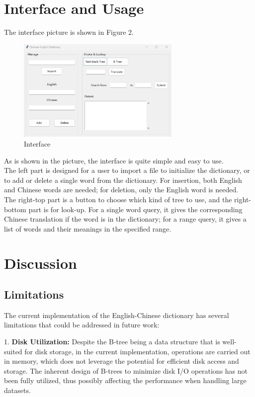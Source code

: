 \documentclass[UTF8]{ctexart}
\begin{document}
\section{Interface and Usage}
The interface picture is shown in Figure 2.\\
\begin{figure}[h]
    \centering
    \includegraphics[width=0.7\textwidth]{UI.png}
    \caption{Interface}
    \label{fig:interface}
\end{figure}

As is shown in the picture, the interface is quite simple and easy to use.\\
The left part is designed for a user to import a file to initialize the dictionary, or to
add or delete a single word from the dictionary. For insertion, both English and Chinese words are needed; 
for deletion, only the English word is needed.\\
The right-top part is a button to choose which kind of tree to use, and the right-bottom part is for look-up.
For a single word query, it gives the corresponding Chinese translation if the word is in the dictionary;
for a range query, it gives a list of words and their meanings in the specified range.\\

\section{Discussion}

\subsection{Limitations}
The current implementation of the English-Chinese dictionary has several limitations that could be addressed in future work:

1. \textbf{Disk Utilization:} Despite the B-tree being a data structure that is well-suited for disk storage, in the current implementation, operations are carried out in memory, which does not leverage the potential for efficient disk access and storage. The inherent design of B-trees to minimize disk I/O operations has not been fully utilized, thus possibly affecting the performance when handling large datasets.
\end{document}
